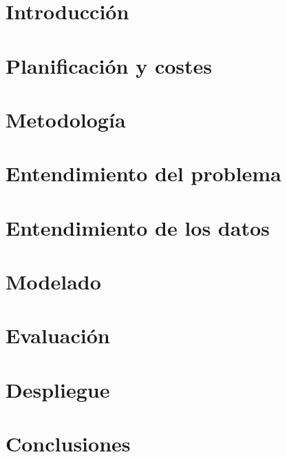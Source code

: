 \documentclass[xcolor=dvipsnames]{beamer}
\begin{document}
\AtBeginSection{\frame{\sectionpage}}




\section{Introducción}


\section{Planificación y costes}


\section{Metodología}


\section{Entendimiento del problema}


\section{Entendimiento de los datos}


\section{Modelado}


\section{Evaluación}


\section{Despliegue}


\section{Conclusiones}

\end{document}
